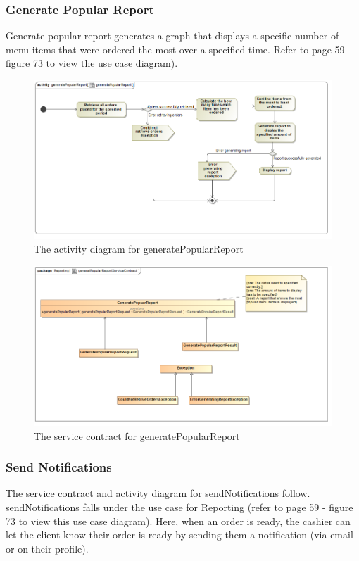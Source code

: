 \documentclass[a4paper,12pt]{report}
\begin{document}
\subsubsection{Generate Popular Report}
Generate popular report generates a graph that displays a specific number of menu items that were ordered the most over a specified time. Refer to page 59 - figure 73 to view the use case diagram).
\begin{figure}[H]
 \centering
  \includegraphics[width=1.0\textwidth]{../images/generatePopularReportActivityDiagram.png}
    \caption{The activity diagram for generatePopularReport}
    \end{figure}
    
    \begin{figure}[H]
  \centering
    \includegraphics[width=1.0\textwidth]{../images/generatPopularReportServiceContract.png}
    \caption{The service contract for generatePopularReport} 
\end{figure}
    
      

\subsubsection{Send Notifications}
The service contract and activity diagram for sendNotifications follow. sendNotifications falls under the use case for Reporting (refer to page 59 - figure 73 to view this use case diagram). Here, when an order is ready, the cashier can let the client know their order is ready by sending them a notification (via email or on their profile).
\end{document}
